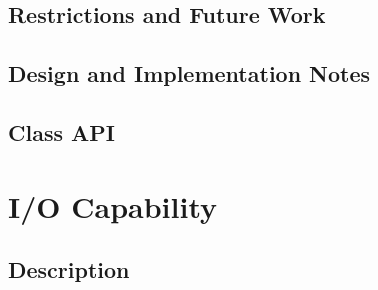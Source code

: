\documentclass[english]{article}
\begin{document}
\subsection{Restrictions and Future Work}

\subsection{Design and Implementation Notes}

\subsection{Class API}

%
%
%
%
%
%
\newpage
\section{I/O Capability}
\subsection{Description}

%
%
%
%
%
\end{document}
